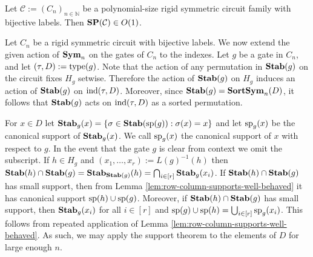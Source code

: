 \documentclass[../paper.tex]{subfiles}
\begin{document}
\begin{cor}
  Let $\mathcal{C} := (C_n)_{n \in \mathbb{N}}$ be a polynomial-size rigid
  symmetric circuit family with bijective labels. Then $\text{\textbf{SP}}(\mathcal{C}) \in
  O(1)$.
\end{cor}



Let $C_n$ be a rigid symmetric circuit with bijective labels. We now extend the given action of $\text{\textbf{Sym}}_n$ on the gates of $C_n$ to the indexes. Let $g$ be a gate in $C_n$, and let $(\tau, D) := \text{type}(g)$. Note that the action of any permutation in $\text{\textbf{Stab}}(g)$ on the circuit fixes $H_g$ setwise. Therefore the action of $\text{\textbf{Stab}}(g)$ on $H_g$ induces an action of $\text{\textbf{Stab}}(g)$ on $\text{\upshape ind}(\tau, D)$. Moreover, since $\text{\textbf{Stab}}(g) = \text{\textbf{SortSym}}_n(D)$, it follows that $\text{\textbf{Stab}}(g)$ acts on $\text{\upshape ind}(\tau, D)$ as a sorted permutation.

For $x \in D$ let $\text{\textbf{Stab}}_g(x) = \{\sigma \in \text{\textbf{Stab}}(\text{sp}(g)) : \sigma (x) = x\}$ and let $\text{sp}_g(x)$ be the canonical support of $\text{\textbf{Stab}}_g(x)$. We call $\text{sp}_g(x)$ the canonical support of $x$ with respect to $g$. In the event that the gate $g$ is clear from context we omit the subscript. If $h \in H_g$ and $(x_1, \ldots ,x_r) := L(g)^{-1}(h)$ then $\text{\textbf{Stab}}(h) \cap \text{\textbf{Stab}}(g) = \text{\textbf{Stab}}_{\text{\textbf{Stab}}(g)}(h) = \bigcap_{i \in [r]} \text{\textbf{Stab}}_g(x_i)$. If $\text{\textbf{Stab}}(h) \cap \text{\textbf{Stab}}(g)$ has small support, then from Lemma \ref{lem:row-column-supports-well-behaved} it has canonical support $\text{sp}(h) \cup \text{sp}(g)$. Moreover, if $\text{\textbf{Stab}}(h) \cap \text{\textbf{Stab}}(g)$ has small support, then $\text{\textbf{Stab}}_g(x_i)$ for all $i \in [r]$ and $\text{sp}(g) \cup \text{sp}(h) = \bigcup_{i \in [r]}\text{sp}_g(x_i)$. This follows from repeated application of Lemma \ref{lem:row-column-supports-well-behaved}. As such, we may apply the support theorem to the elements of $D$ for large enough $n$.


\end{document}
